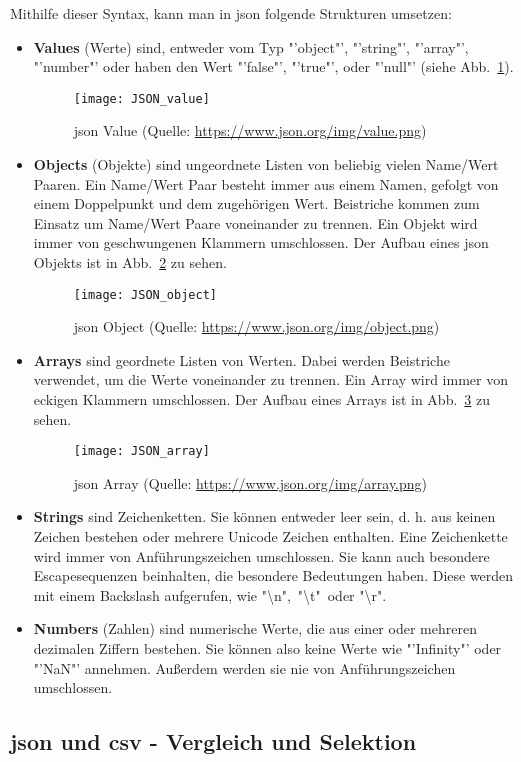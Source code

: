 Mithilfe dieser Syntax, kann man in \acs{json} folgende Strukturen umsetzen:
\begin{itemize}
	\item \textbf{Values} (\dt Werte) sind, entweder vom Typ "'object"', "'string"', "'array"', "'number"' oder haben den Wert "'false"', "'true"', oder "'null"' (siehe Abb.~\ref{fig:json_value}).
	\begin{figure}[H]
		\centering
		\texttt{[image: JSON\_value]}
		\caption[JSON Wert]{\acs{json} Value (Quelle: \url{https://www.json.org/img/value.png})  \label{fig:json_value}}
	\end{figure}
	
	\item \textbf{Objects} (\dt Objekte) sind ungeordnete Listen von beliebig vielen Name/Wert Paaren. Ein Name/Wert Paar besteht immer aus einem Namen, gefolgt von einem Doppelpunkt und dem zugehörigen Wert. Beistriche kommen zum Einsatz um Name/Wert Paare voneinander zu trennen. Ein Objekt wird immer von geschwungenen Klammern umschlossen. Der Aufbau eines \acs{json} Objekts ist in Abb.~\ref{fig:json_object} zu sehen.
	
	\begin{figure}[H]
		\centering
		\texttt{[image: JSON\_object]}
		\caption[JSON Objekt]{\acs{json} Object (Quelle: \url{https://www.json.org/img/object.png})  \label{fig:json_object}}
	\end{figure}
	
	\item \textbf{Arrays} sind geordnete Listen von Werten. Dabei werden Beistriche verwendet, um die Werte voneinander zu trennen. Ein Array wird immer von eckigen Klammern umschlossen. Der Aufbau eines Arrays ist in Abb.~\ref{fig:json_array} zu sehen.
	
	\begin{figure}[H]
		\centering
		\texttt{[image: JSON\_array]}
		\caption[JSON Array]{\acs{json} Array (Quelle: \url{https://www.json.org/img/array.png})  \label{fig:json_array}}
	\end{figure}
	
	\item \textbf{Strings} sind Zeichenketten. Sie können entweder leer sein, d. h. aus keinen Zeichen bestehen oder mehrere Unicode Zeichen enthalten. Eine Zeichenkette wird immer von Anführungszeichen umschlossen. Sie kann auch besondere Escapesequenzen beinhalten, die besondere Bedeutungen haben. Diese werden mit einem Backslash aufgerufen, wie \zB "\textbackslash n",\ "\textbackslash t"\ oder "\textbackslash r".
	
	\item \textbf{Numbers} (\dt Zahlen) sind numerische Werte, die aus einer oder mehreren dezimalen Ziffern bestehen. Sie können also keine Werte wie \zB "'Infinity"' oder "'NaN"' annehmen. Außerdem werden sie nie von Anführungszeichen umschlossen. 
	
\end{itemize}

\subsection{\acs{json} und \acs{csv} - Vergleich und Selektion}
\cite{SQLizer:2017}
